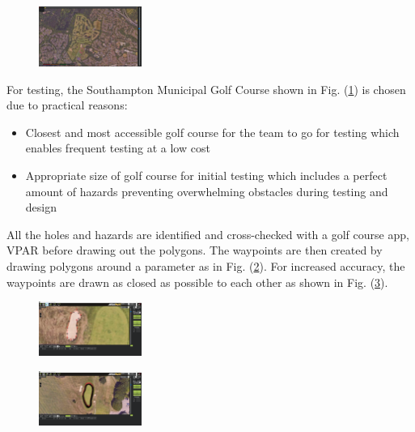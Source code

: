 \documentclass[11pt,landscape]{article}
\begin{document}
\begin{multicols}{3}
\begin{figure}[H]
    \begin{center}
        \includegraphics[width=0.3\textwidth]{Municipal.png}
        \label{fig:municipal}
    \end{center}
\end{figure}

For testing, the Southampton Municipal Golf Course shown in Fig.
(\ref{fig:municipal}) is chosen due to practical reasons: 

\begin{itemize}
    \item Closest and most accessible golf course for the team to go for testing
    which enables frequent testing at a low cost
    \item Appropriate size of golf course for initial testing which includes a
    perfect amount of hazards preventing overwhelming obstacles during testing
    and design 
\end{itemize}

All the holes and hazards are identified and cross-checked with a golf course
app, VPAR before drawing out the polygons. The waypoints are then created by
drawing polygons around a parameter as in Fig. (\ref{fig:poly2}). For increased
accuracy, the waypoints are drawn as closed as possible to each other as shown
in Fig. (\ref{fig:poly1}).

\begin{figure}[H]
    \begin{center}
        \includegraphics[width=0.3\textwidth]{polygon 2.png}
        \label{fig:poly2}
    \end{center}
\end{figure}

\begin{figure}[H]
    \begin{center}
        \includegraphics[width=0.3\textwidth]{polygon 1.png}
        \label{fig:poly1}
    \end{center}
\end{figure}


\end{multicols}
\end{document}
